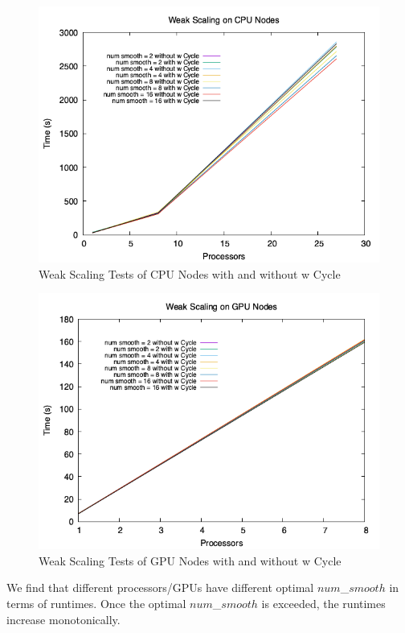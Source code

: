 \documentclass{article}
\begin{document}
\begin{figure}[H]
        \includegraphics[width=\textwidth]{Weak Scaling on CPU Nodes.png}
        \caption{Weak Scaling Tests of CPU Nodes with and without w Cycle}  
        \label{fig:CPU nodes with and without w cycle}
\end{figure}
\begin{figure}[H]
        \includegraphics[width=\textwidth]{Weak Scaling on GPU Nodes.png}
        \caption{Weak Scaling Tests of GPU Nodes with and without w Cycle}  
        \label{fig:GPU nodes with and without w cycle}
\end{figure}

We find that different processors/GPUs have different optimal $num$\_$smooth$ in terms of runtimes. Once the optimal $num$\_$smooth$ is exceeded, the runtimes increase monotonically.
\end{document}
